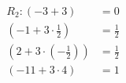 \documentclass[preview]{standalone}
\begin{document}
\begin{align*}
R_2: (-3 + 3) & = 0 \\ (-1 + 3\cdot\frac{1}{2}) & = \frac{1}{2} \\ (2 + 3\cdot(-\frac{1}{2})) & = \frac{1}{2} \\ (-11 + 3\cdot4) & = 1
\end{align*}
\end{document}
